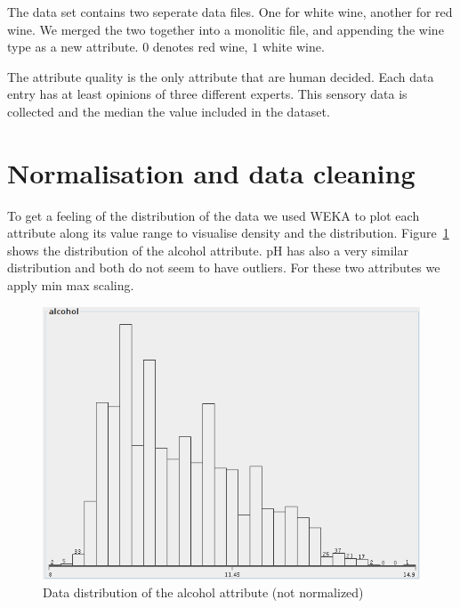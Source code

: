 \documentclass{acm_proc_article-sp}
\begin{document}
The data set contains two seperate data files. One for white wine,
another for red wine. We merged the two together into a monolitic file,
and appending the wine type as a new attribute. $0$ denotes red wine, $1$ white wine.

The attribute quality is the only attribute that are human decided.
Each data entry has at least opinions of three different experts. This
sensory data is collected and the median the value included in the
dataset.

\section{Normalisation and data cleaning}

To get a feeling of the distribution of the data we used
WEKA to plot each attribute along its value range to visualise
density and the distribution.
Figure~\ref{fig:dist-alcohol} shows the distribution of the alcohol attribute. pH has
also a very similar distribution and both do not seem to have outliers.
For these two attributes we apply min max scaling.

\begin{figure}
\centering
\includegraphics[width=0.6\linewidth]{img/dist-alcohol}
\caption{Data distribution of the alcohol attribute (not normalized)}
\label{fig:dist-alcohol}
\end{figure}

\end{document}

